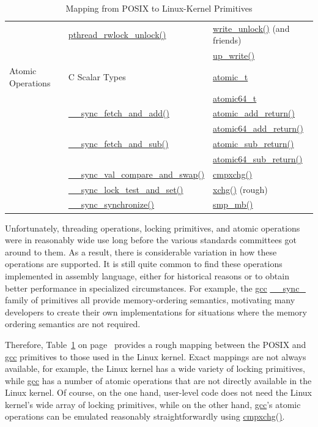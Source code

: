 \begin{table}
\begin{center}
\begin{tabular}{l|l|l}
	\cline{2-3}
		& \url{pthread_rwlock_unlock()}
			& \url{write_unlock()} (and friends) \\
		&	& \url{up_write()} \\
	\hline
	\hline
	Atomic Operations
		& C Scalar Types
			& \url{atomic_t} \\
		&	& \url{atomic64_t} \\
	\cline{2-3}
		& \url{__sync_fetch_and_add()}
			& \url{atomic_add_return()} \\
		&	& \url{atomic64_add_return()} \\
	\cline{2-3}
		& \url{__sync_fetch_and_sub()}
			& \url{atomic_sub_return()} \\
		&	& \url{atomic64_sub_return()} \\
	\cline{2-3}
		& \url{__sync_val_compare_and_swap()}
			& \url{cmpxchg()} \\
	\cline{2-3}
		& \url{__sync_lock_test_and_set()}
			& \url{xchg()} (rough) \\
	\cline{2-3}
		& \url{__sync_synchronize()}
			& \url{smp_mb()} \\
\end{tabular}
\end{center}
\caption{Mapping from POSIX to Linux-Kernel Primitives}
\label{tab:advsync:Mapping from POSIX to Linux-Kernel Primitives}
\end{table}

Unfortunately, threading operations, locking primitives, and atomic
operations were in reasonably wide use long before the various standards
committees got around to them.
As a result, there is considerable variation in how these operations
are supported.
It is still quite common to find these operations implemented in
assembly language, either for historical reasons or to obtain better
performance in specialized circumstances.
For example, the \url{gcc} \url{__sync_} family of primitives all
provide memory-ordering semantics, motivating many developers to
create their own implementations for situations where the memory
ordering semantics are not required.

Therefore,
Table~\ref{tab:advsync:Mapping from POSIX to Linux-Kernel Primitives} on
page~\pageref{tab:advsync:Mapping from POSIX to Linux-Kernel Primitives}
provides a rough mapping between the POSIX and
\url{gcc} primitives to those used in the Linux kernel.
Exact mappings are not always available, for example, the Linux kernel
has a wide variety of locking primitives, while \url{gcc} has a number
of atomic operations that are not directly available in the Linux kernel.
Of course, on the one hand, user-level code does not need the Linux
kernel's wide array of locking primitives, while on the other hand,
\url{gcc}'s atomic operations can be emulated reasonably straightforwardly
using \url{cmpxchg()}.

